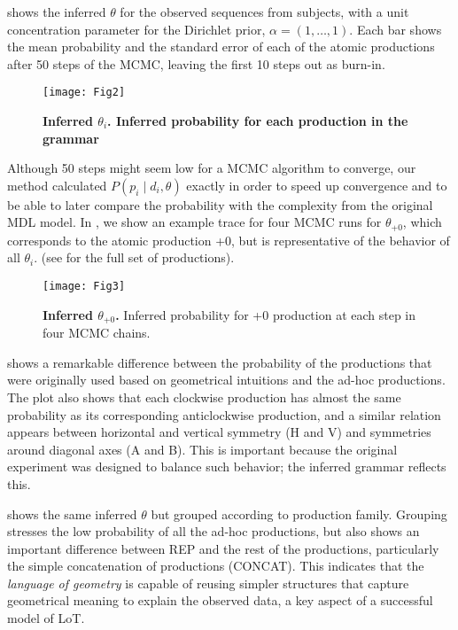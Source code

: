  shows the inferred $\theta$ for the observed sequences from subjects, with a unit concentration parameter for the Dirichlet prior, $\alpha = (1, \dots, 1)$. Each bar shows the mean probability and the standard error of each of the atomic productions after 50 steps of the MCMC, leaving the first 10 steps out as burn-in.

\begin{figure}[htpb]
    \centering
    \texttt{[image: Fig2]}
    \caption{\bf{Inferred $\theta_i$.} Inferred probability for each production in the grammar}
    \label{fig:inferredtheta}
\end{figure}

Although 50 steps might seem low for a MCMC algorithm to converge, our method calculated $P(p_i \mid d_i, \theta)$ exactly in order to speed up convergence and to be able to later compare the probability with the complexity from the original MDL model.  In , we show an example trace for four MCMC runs for $\theta_{\text{+0}}$, which corresponds to the atomic production +0, but is representative of the behavior of all $\theta_i$. (see  for the full set of productions).

\begin{figure}[htpb]
    \centering
    \texttt{[image: Fig3]}
    \caption{{\bf Inferred $\theta_{\text{+0}}$.} Inferred probability for +0 production at each step in four MCMC chains.}
    \label{fig:convergetheta}
\end{figure}

 shows a remarkable difference between the probability of the productions that were originally used based on geometrical intuitions and the ad-hoc productions. The plot also shows that each clockwise production has almost the same probability as its corresponding anticlockwise production, and a similar relation appears between horizontal and vertical symmetry (H and V) and symmetries around diagonal axes (A and B). This is important because the original experiment was designed to balance such behavior; the inferred grammar reflects this.

 shows the same inferred $\theta$ but grouped according to production family. Grouping stresses the low probability of all the ad-hoc productions, but also shows an important difference between REP and the rest of the productions, particularly the simple concatenation of productions (CONCAT). This indicates that the \textit{language of geometry} is capable of reusing simpler structures that capture geometrical meaning to explain the observed data, a key aspect of a successful model of LoT.

